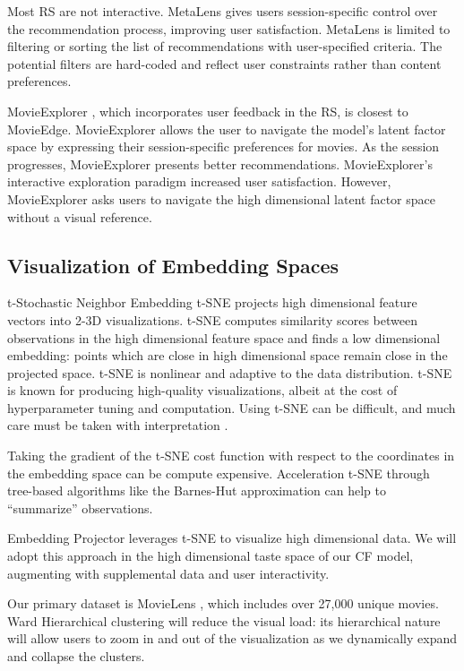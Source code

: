 Most RS are not interactive. MetaLens \cite{schafer2002meta}gives users session-specific control over the recommendation process, improving user satisfaction. MetaLens is limited to filtering or sorting the list of recommendations with user-specified criteria. The potential filters are hard-coded and reflect user constraints rather than content preferences. 

MovieExplorer \cite{taijala2018movieexplorer}, which incorporates user feedback in the RS, is closest to MovieEdge. MovieExplorer allows the user to navigate the model's latent factor space by expressing their session-specific preferences for movies.  As the session progresses, MovieExplorer presents better recommendations. MovieExplorer’s interactive exploration paradigm increased user satisfaction. However, MovieExplorer asks users to navigate the high dimensional latent factor space without a visual reference. 

\subsection{Visualization of Embedding Spaces}

t-Stochastic Neighbor Embedding \mbox{t-SNE} \cite{maaten2008visualizing} projects high dimensional feature vectors into 2-3D visualizations. \mbox{t-SNE} computes similarity scores between observations in the high dimensional feature space and finds a low dimensional embedding: points which are close in high dimensional space remain close in the projected space. \mbox{t-SNE} is nonlinear and adaptive to the data distribution. \mbox{t-SNE} is known for producing high-quality visualizations, albeit at the cost of hyperparameter tuning and computation. Using \mbox{t-SNE} can be difficult, and much care must be taken with interpretation \cite{wattenberg2016how}.

Taking the gradient of the \mbox{t-SNE} cost function with respect to the coordinates in the embedding space can be compute expensive.  Acceleration \mbox{t-SNE} through tree-based algorithms like the Barnes-Hut approximation \cite{van2014accelerating} can help to “summarize” observations.  

Embedding Projector \cite{smilkov2016embedding} leverages \mbox{t-SNE} to visualize high dimensional data. We will adopt this approach in the high dimensional taste space of our CF model, augmenting with supplemental data and user interactivity. 

Our primary dataset is MovieLens \cite{harper2016movielens}, which includes over 27,000 unique movies. Ward Hierarchical clustering \cite{ward1963hierarchical} will reduce the visual load:  its hierarchical nature will allow users to zoom in and out of the visualization as we dynamically expand and collapse the clusters.

